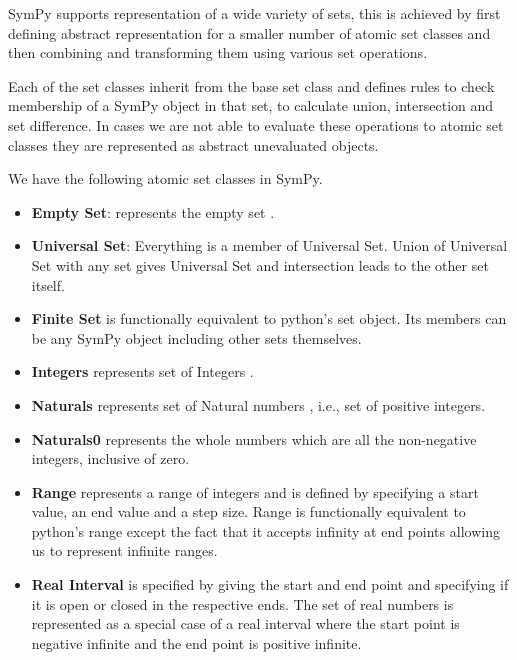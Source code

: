 


SymPy supports representation of a wide variety of sets, this is achieved by
first defining abstract representation for a smaller number of atomic set
classes and then combining and transforming them using various set operations.

Each of the set classes inherit from the base set class and defines rules to
check membership of a SymPy object in that set, to calculate union,
intersection and set difference. In cases we are not able to evaluate these
operations to atomic set classes they are represented as abstract unevaluated
objects.


We have the following atomic set classes in SymPy.

\begin{itemize}

    \item \textbf{Empty Set}: represents the empty set \emptyset .

    \item \textbf{Universal Set}: Everything is a member of Universal Set.
        Union of Universal Set with any set gives Universal Set and
        intersection leads to the other set itself.

    \item \textbf{Finite Set} is functionally equivalent to python's set
        object. Its members can be any SymPy object including other sets
        themselves.

    \item \textbf{Integers} represents set of Integers .

    \item \textbf{Naturals} represents set of Natural numbers , i.e.,
        set of positive integers.

    \item \textbf{Naturals0} represents the whole numbers which are all the
        non-negative integers, inclusive of zero.

    \item \textbf{Range} represents a range of integers and is defined by
        specifying a start value, an end value and a step size. Range is
        functionally equivalent to python's range except the fact that it
        accepts infinity at end points allowing us to represent infinite
        ranges.


    \item \textbf{Real Interval} is specified by giving the start and end point
        and specifying if it is open or closed in the respective ends. The set
        of real numbers is represented as a special case of a real interval
        where the start point is negative infinite and the end point is
        positive infinite.


\end{itemize}



